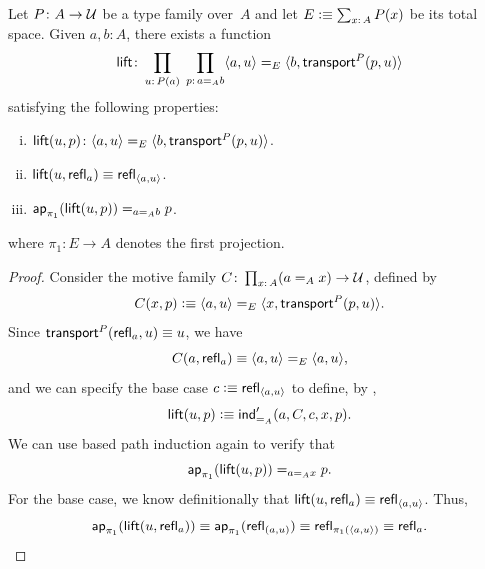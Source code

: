 \begin{thm}{}\label{thm:path-lift}
    Let\/ $P\colon A\to\univ$ be a type family over\/~$A$ and let\/ $E\defeq\sum_{x\colon A}P(x)$ be its total space. Given $a,b\colon A$, there exists a function
    \[
        \fun{lift}\colon\prod_{u\colon P(a)}\;
            \prod_{p\colon a\eq Ab}
            \dep{a,u}\eq E\dep{b,\fun{transport}^P(p,u)}
    \]
    satisfying the following properties:
    \begin{enumerate}[i),font=\upshape]
        \item $\fun{lift}(u,p)\colon\dep{a,u}\eq E \dep{b,\fun{transport}^P(p,u)}$.
        \item $\mathsf{lift}(u,\mathsf{refl}_a)\equiv\mathsf{refl}_{\langle a,u\rangle}$.
        \item $\mathsf{ap}_{\pi_1}(\mathsf{lift}(u,p))\mathrel{=_{a\mathrel{=_{A}}b}}p$.
    \end{enumerate}
    where\/ $\pi_1\colon E\to A$ denotes the first projection.\footnotemark
\end{thm}


\begin{proof}
    Consider the motive family\/ $C\colon\prod_{x\colon A}(a\eq Ax)\to\univ$, defined by
    \[
        C(x,p)\mathrel{\vcentcolon}\equiv
            \langle a,u\rangle\mathrel{=_{E}}\langle x,\mathsf{transport}^P(p,u)\rangle.
    \]
    Since\/ $\mathsf{transport}^P(\mathsf{refl}_a,u)\equiv u$, we have
    \[
        C(a,\mathsf{refl}_a)\equiv\langle a,u\rangle\mathrel{=_{E}}\langle a,u\rangle,
    \]
    and we can specify the base case\/ $c\mathrel{\vcentcolon}\equiv\mathsf{refl}_{\langle a,u\rangle}$ to define, by ,
    \[
        \mathsf{lift}(u,p)\mathrel{\vcentcolon}\equiv\mathsf{ind}'_{\mathrel{=_{A}}}(a,C,c,x,p).
    \]
    We can use based path induction again to verify that
    \[
        \mathsf{ap}_{\mathsf{\pi}_1}(\mathsf{lift}(u,p)) \mathrel{=_{a\mathrel{=_{A}}x}} p.
    \]
    For the base case, we know definitionally that\/ $\mathsf{lift}(u,\mathsf{refl}_a) \equiv \mathsf{refl}_{\langle a,u\rangle}$. Thus,
    \[
        \mathsf{ap}_{\mathsf{\pi}_1}(\mathsf{lift}(u,\mathsf{refl}_a))
        \equiv \mathsf{ap}_{\mathsf{\pi}_1}(\mathsf{refl}_{(a,u)})
        \equiv \mathsf{refl}_{\pi_1(\langle a,u\rangle)}
        \equiv \mathsf{refl}_a.
    \]
\end{proof}

